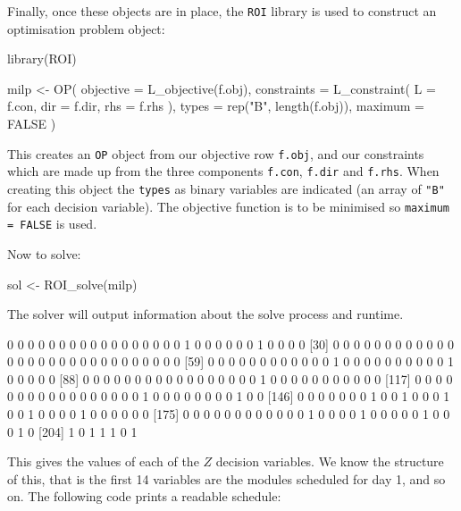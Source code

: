 Finally, once these objects are in place, the
\texttt{ROI} library is used to construct an optimisation problem object:

\begin{Rin-no-test}
library(ROI)

milp <- OP(
  objective = L_objective(f.obj),
  constraints = L_constraint(
    L = f.con,
    dir = f.dir,
    rhs = f.rhs
  ),
  types = rep("B", length(f.obj)),
  maximum = FALSE
)
\end{Rin-no-test}

This creates an \texttt{OP} object from our objective row
\texttt{f.obj}, and our constraints which are made up from the three
components \texttt{f.con}, \texttt{f.dir} and
\texttt{f.rhs}.
When creating this object the \texttt{types} as binary
variables are indicated (an array of \texttt{"B"} for each decision
variable).
The objective function is to be minimised so
\texttt{maximum = FALSE} is used.

Now to solve:

\begin{Rin-no-test}
sol <- ROI_solve(milp)
\end{Rin-no-test}

The solver will output information about the solve process and runtime.


\begin{Rout-no-test}
  [1] 0 0 0 0 0 0 0 0 0 0 0 0 0 0 0 0 0 1 0 0 0 0 0 0 1 0 0 0 0
 [30] 0 0 0 0 0 0 0 0 0 0 0 0 0 0 0 0 0 0 0 0 0 0 0 0 0 0 0 0 0
 [59] 0 0 0 0 0 0 0 0 0 0 0 0 1 0 0 0 0 0 0 0 0 0 0 1 0 0 0 0 0
 [88] 0 0 0 0 0 0 0 0 0 0 0 0 0 0 0 0 0 1 0 0 0 0 0 0 0 0 0 0 0
[117] 0 0 0 0 0 0 0 0 0 0 0 0 0 0 0 0 0 1 0 0 0 0 0 0 0 0 1 0 0
[146] 0 0 0 0 0 0 0 1 0 0 1 0 0 0 1 0 0 1 0 0 0 0 1 0 0 0 0 0 0
[175] 0 0 0 0 0 0 0 0 0 0 0 0 1 0 0 0 0 1 0 0 0 0 0 1 0 0 0 1 0
[204] 1 0 1 1 1 0 1
\end{Rout-no-test}

This gives the values of each of the \(Z\) decision variables.
We know the structure of this, that is the first 14 variables are the modules
scheduled for day 1, and so on.
The following code prints a readable schedule:



